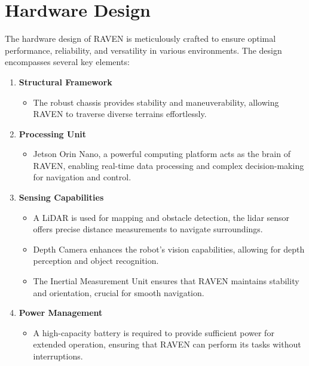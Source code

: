 \section{\fontsize{14}{16} Hardware Design}
{
	\fontsize{12}{14}
	The hardware design of RAVEN is meticulously crafted to ensure optimal performance, reliability, and versatility in various environments. The design encompasses several key elements:
	
	\begin{enumerate}[label=\textbf{\arabic*}.]
		\item \textbf{Structural Framework} 
		\begin{itemize}
			\item The robust chassis provides stability and maneuverability, allowing RAVEN to traverse diverse terrains effortlessly.
		\end{itemize}
		
		\item \textbf{Processing Unit} 
		\begin{itemize}
			\item Jetson Orin Nano, a powerful computing platform acts as the brain of RAVEN, enabling real-time data processing and complex decision-making for navigation and control.
		\end{itemize}
		
		\item \textbf{Sensing Capabilities} 
		\begin{itemize}
			\item A LiDAR is used for mapping and obstacle detection, the lidar sensor offers precise distance measurements to navigate surroundings.
			
			\item Depth Camera enhances the robot's vision capabilities, allowing for depth perception and object recognition.
			
			\item The Inertial Measurement Unit ensures that RAVEN maintains stability and orientation, crucial for smooth navigation.
		\end{itemize}
		
		\item \textbf{Power Management} 
		\begin{itemize}
			\item A high-capacity battery is required to provide sufficient power for extended operation, ensuring that RAVEN can perform its tasks without interruptions.
		\end{itemize}
	

\end{enumerate}}
